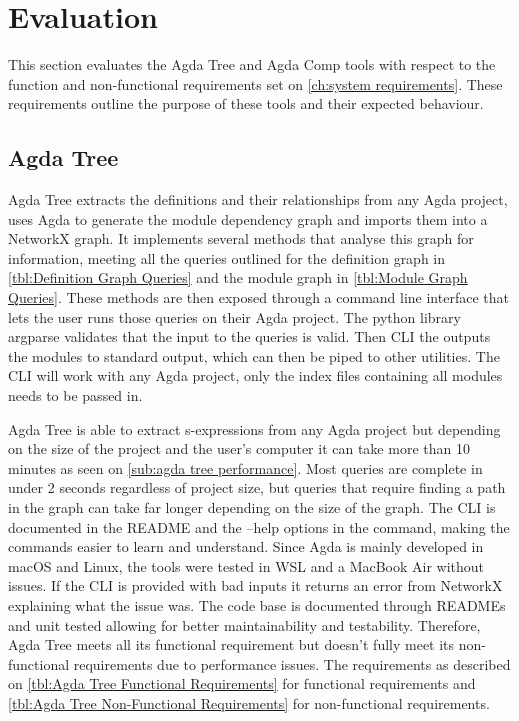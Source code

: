 
\chapter{Evaluation}

This section evaluates the Agda Tree and Agda Comp tools with respect to the
function and non-functional requirements set on \cref{ch:system
requirements}. These requirements outline the purpose of these tools and their
expected behaviour.

\section{Agda Tree} \label{sec:eval agda tree}

Agda Tree extracts the definitions and their relationships from any Agda
project, uses Agda to generate the module dependency graph and imports them
into a NetworkX graph. It implements several methods that analyse this
graph for information, meeting all the queries outlined for the definition
graph in \cref{tbl:Definition Graph Queries} and the module graph in 
\cref{tbl:Module Graph Queries}. These methods are then exposed through a
command line interface that lets the user runs those queries on their Agda
project. The python library argparse validates that the input to the queries is
valid. Then CLI the outputs the modules to standard output, which can then be
piped to other utilities. The CLI will work with any Agda project, only the
index files containing all modules needs to be passed in. 

Agda Tree is able to extract s-expressions from any Agda project but depending
on the size of the project and the user's computer it can take more than 10
minutes as seen on \cref{sub:agda tree performance}. Most queries are
complete in under 2 seconds regardless of project size, but queries that
require finding a path in the graph can take far longer depending on the size
of the graph. The CLI is documented in the README and the \textsf{--help}
options in the command, making the commands easier to learn and understand.
Since Agda is mainly developed in macOS and Linux, the tools were tested in WSL
and a MacBook Air without issues. If the CLI is provided with bad inputs it
returns an error from NetworkX explaining what the issue was. The code base is
documented through READMEs and unit tested allowing for better maintainability
and testability. Therefore, Agda Tree meets all its functional requirement but
doesn't fully meet its non-functional requirements due to performance issues.
The requirements as described on \cref{tbl:Agda Tree Functional Requirements} for functional requirements and 
\cref{tbl:Agda Tree Non-Functional Requirements} for non-functional requirements.

